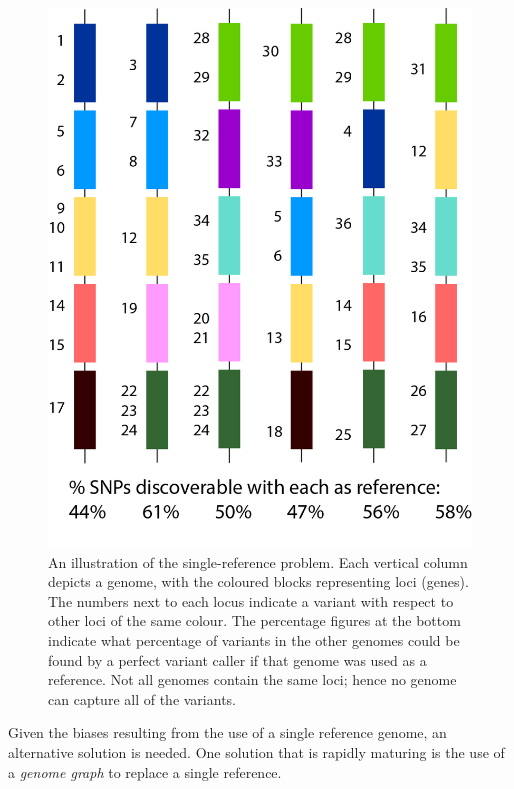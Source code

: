 \begin{figure}
\centering
\includegraphics[height=0.35\textheight]{Chapter0/Figs/single_ref_problem.png}
\caption{An illustration of the single-reference problem. Each vertical column depicts a genome, with the coloured blocks representing loci (genes). The numbers next to each locus indicate a variant with respect to other loci of the same colour. The percentage figures at the bottom indicate what percentage of variants in the other genomes could be found by a perfect variant caller if that genome was used as a reference. Not all genomes contain the same loci; hence no genome can capture all of the variants.}
\label{fig:reference-bias}
\end{figure}

Given the biases resulting from the use of a single reference genome, an alternative solution is needed. One solution that is rapidly maturing is the use of a \emph{genome graph} to replace a single reference.

